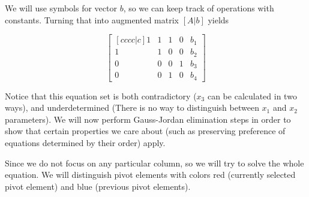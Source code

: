 We will use symbols for vector \textbf{$b$}, so we can keep track of operations with constants.
Turning that into augmented matrix $[A|b]$ yields

\begin{equation}
\begin{bmatrix}[cccc|c]
    1 & 1 & 1 & 0 & b_1 \\ 
    1 & 1 & 0 & 0 & b_2 \\ 
    0 & 0 & 0 & 1 & b_3 \\ 
    0 & 0 & 1 & 0 & b_4
\end{bmatrix}
\end{equation}

Notice that this equation set is both contradictory ($x_3$ can be calculated in two ways), and underdetermined (There is no way to distinguish between $x_1$ and $x_2$ parameters).
We will now perform Gauss-Jordan elimination steps in order to show that certain properties we care about (such as preserving preference of equations determined by their order) apply.

Since we do not focus on any particular column, so we will try to solve the whole equation.
We will distinguish pivot elements with colors red (currently selected pivot element) and blue (previous pivot elements).

